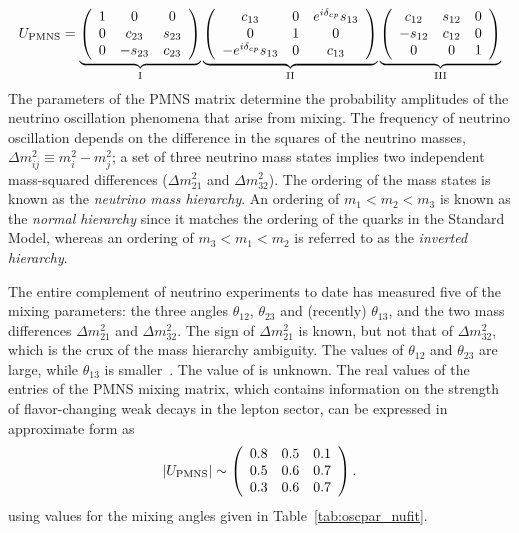 \begin{equation}
U_{\rm PMNS} = 
  \underbrace{
    \left( \begin{array}{ccc}
        1 & 0 & 0 \\ 
        0 & c_{23} & s_{23} \\ 
        0 & -s_{23} & c_{23}
    \end{array} \right)
  }_{\rm I}
\underbrace{
  \left( \begin{array}{ccc}
      c_{13} & 0 & e^{i\delta_{cp}}s_{13} \\ 
      0 & 1 & 0 \\ 
      -e^{i\delta_{cp}}s_{13} & 0 & c_{13}
  \end{array} \right) 
}_{\rm II}
\underbrace{
 \left( \begin{array}{ccc}
      c_{12} & s_{12} & 0 \\ 
      -s_{12} & c_{12} & 0 \\ 
      0 & 0 & 1
  \end{array} \right) 
}_{\rm III}
\label{eqn:pmns}
\end{equation}
The parameters of the PMNS
matrix determine the probability amplitudes of the neutrino
oscillation phenomena that arise from mixing.  The frequency of neutrino oscillation 
depends on the difference in the squares of the neutrino
masses, $\Delta m^{2}_{ij} \equiv m^{2}_{i} - m^{2}_{j}$; a set of three
neutrino mass states implies two independent mass-squared differences
($\Delta m^{2}_{21}$ and $\Delta m^{2}_{32}$). The ordering of the
mass states is known as the \emph{neutrino mass hierarchy}. An ordering of
$m_1 < m_2 < m_3$ is known as the \emph{normal hierarchy} since it matches
the ordering of the quarks in the Standard Model, whereas an ordering of $m_3 < m_1 < m_2$
is referred to as the \emph{inverted hierarchy}.

The entire complement of neutrino experiments to date has measured
five of the mixing parameters: the three angles $\theta_{12}$,
$\theta_{23}$ and (recently) $\theta_{13}$, and the two mass differences
$\Delta m^{2}_{21}$ and $\Delta m^{2}_{32}$. The sign of $\Delta
m^{2}_{21}$ is known, but not that of $\Delta m^{2}_{32}$, which 
is the crux of the 
mass hierarchy ambiguity.
The values of $\theta_{12}$ and $\theta_{23}$ are large, while 
$\theta_{13}$ is smaller~\cite{An:2013zwz}. The value of \deltacp is unknown.
The real values of the entries of the PMNS mixing matrix, which
contains information on the strength of flavor-changing weak decays in
the lepton sector, can be expressed in approximate form as
\begin{equation}
|U_{\rm PMNS}|\sim \left(\begin{array}{ccc} 0.8 & 0.5 & 0.1 \\ 0.5 & 0.6 & 0.7 \\ 0.3 & 0.6 & 0.7\end{array} \right).
\label{eq:pmnsmatrix}
\end{equation}
using values for the mixing angles given in Table~\ref{tab:oscpar_nufit}.

